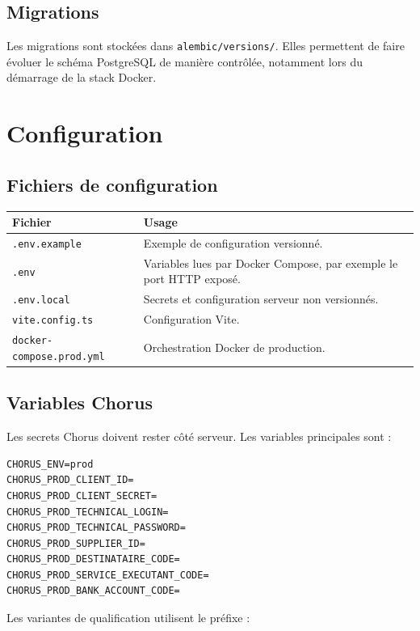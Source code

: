 \documentclass[11pt,a4paper]{article}
\begin{document}
\subsection{Migrations}

Les migrations sont stockées dans \texttt{alembic/versions/}. Elles permettent de
faire évoluer le schéma PostgreSQL de manière contrôlée, notamment lors du
démarrage de la stack Docker.

\section{Configuration}

\subsection{Fichiers de configuration}

\begin{longtable}{|p{}|p{}|}
  \hline
  \textbf{Fichier} & \textbf{Usage} \\
  \hline
  \texttt{.env.example} &
  Exemple de configuration versionné. \\
  \hline
  \texttt{.env} &
  Variables lues par Docker Compose, par exemple le port HTTP exposé. \\
  \hline
  \texttt{.env.local} &
  Secrets et configuration serveur non versionnés. \\
  \hline
  \texttt{vite.config.ts} &
  Configuration Vite. \\
  \hline
  \texttt{docker-compose.prod.yml} &
  Orchestration Docker de production. \\
  \hline
\end{longtable}

\subsection{Variables Chorus}

Les secrets Chorus doivent rester côté serveur. Les variables principales sont :

\begin{lstlisting}
CHORUS_ENV=prod
CHORUS_PROD_CLIENT_ID=
CHORUS_PROD_CLIENT_SECRET=
CHORUS_PROD_TECHNICAL_LOGIN=
CHORUS_PROD_TECHNICAL_PASSWORD=
CHORUS_PROD_SUPPLIER_ID=
CHORUS_PROD_DESTINATAIRE_CODE=
CHORUS_PROD_SERVICE_EXECUTANT_CODE=
CHORUS_PROD_BANK_ACCOUNT_CODE=
\end{lstlisting}

Les variantes de qualification utilisent le préfixe :
\end{document}
